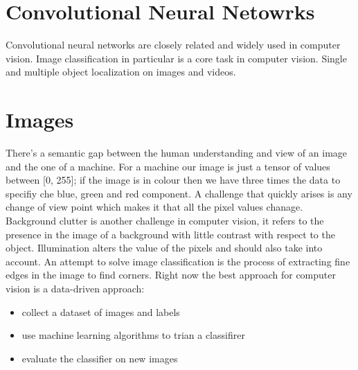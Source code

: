 \documentclass{article}
\begin{document}
\section{Convolutional Neural Netowrks}
Convolutional neural networks are closely related and widely used in computer vision. Image classification in particular is a core task in computer vision. Single and multiple object localization on images and videos.
\section{Images}
There's a semantic gap between the human understanding and view of an image and the one of a machine. For a machine our image is just a tensor of values between [0, 255]; if the image is in colour then we have three times the data to specifiy che blue, green and red component. A challenge that quickly arises is any change of view point which makes it that all the pixel values chanage. Background clutter is another challenge in computer vision, it refers to the presence in the image of a background with little contrast with respect to the object. Illumination alters the value of the pixels and should also take into account. An attempt to solve image classification is the process of extracting fine edges in the image to find corners. Right now the best approach for computer vision is a data-driven approach:
\begin{itemize}
    \item collect a dataset of images and labels
    \item use machine learning algorithms to trian a classifirer
    \item evaluate the classifier on new images
\end{itemize}
\end{document}
